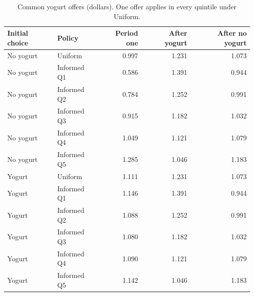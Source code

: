 \begin{table}[htbp]
\centering\small
\caption{Common yogurt offers (dollars). One offer applies in every quintile under Uniform.}
\label{tab:weekly-common-offers}
\begin{tabular}{llrrr}
\toprule
Initial choice & Policy & Period one & After yogurt & After no yogurt \\
\midrule
No yogurt & Uniform & 0.997 & 1.231 & 1.073 \\
No yogurt & Informed Q1 & 0.586 & 1.391 & 0.944 \\
No yogurt & Informed Q2 & 0.784 & 1.252 & 0.991 \\
No yogurt & Informed Q3 & 0.915 & 1.182 & 1.032 \\
No yogurt & Informed Q4 & 1.049 & 1.121 & 1.079 \\
No yogurt & Informed Q5 & 1.285 & 1.046 & 1.183 \\
\addlinespace
Yogurt & Uniform & 1.111 & 1.231 & 1.073 \\
Yogurt & Informed Q1 & 1.146 & 1.391 & 0.944 \\
Yogurt & Informed Q2 & 1.088 & 1.252 & 0.991 \\
Yogurt & Informed Q3 & 1.080 & 1.182 & 1.032 \\
Yogurt & Informed Q4 & 1.090 & 1.121 & 1.079 \\
Yogurt & Informed Q5 & 1.142 & 1.046 & 1.183 \\
\bottomrule
\end{tabular}
\end{table}
